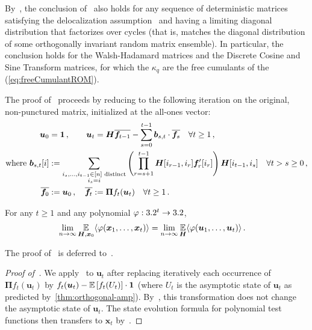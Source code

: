 \noindent By~, the conclusion of~ also holds for any sequence of deterministic matrices satisfying the delocalization assumption~ and having a limiting diagonal distribution that factorizes over cycles (that is, matches the diagonal distribution of some orthogonally invariant random matrix ensemble).
In particular, the conclusion holds for the Walsh-Hadamard matrices and the Discrete Cosine and Sine Transform matrices, for which the $\kappa_q$ are the free cumulants of the \rom  (\cref{eq:freeCumulantROM}).

The proof of~ proceeds by reducing to the following iteration on the original, non-punctured matrix, initialized at the all-ones vector:
\begin{alignat}{2}
    \bm u_0 &= \bm 1\,,\qquad
    \bm u_t
    = \bm H \overline{\bm f_{t-1}}
    - \sum_{s=0}^{t-1} \bm b_{s,t} \cdot \overline{\bm f_s} \quad \forall t\ge 1\,,\nonumber\\
    \text{where } {\bm b}_{s,t}[i]
    &:= \sum_{\substack{i_s,\ldots,i_{t-1}\in[n] \textnormal{ distinct}\\i_s=i}}
    \left(\prod_{r=s+1}^{t-1} \bm H[i_{r-1}, i_{r}] \bm f'_{r}[i_{r}] \right)
    {\bm H}[i_{t-1},i_s]\quad \forall t> s\ge 0\,,\label{eq:backtrackPunctured}\\
    \overline{\bm f_0} &:= \bm u_0\,,\quad \overline{\bm f_t} := \bm \Pi f_t(\bm u_t)\quad \forall t\ge 1\,.\nonumber
\end{alignat}

\begin{lemma}\label{lem:switchInit}
    For any $t\ge 1$ and any polynomial $\varphi:3.2^t \to 3.2$,
    \begin{align*}
        \lim_{n\to\infty} \operatorname*{\mathbb{E}}_{\bm H,\bm x_0} \langle \varphi(\bm x_1, \ldots, \bm x_t)\rangle &= \lim_{n\to\infty} \operatorname*{\mathbb{E}}_{\bm H} \langle \varphi(\bm u_1, \ldots, \bm u_t)\rangle\,.
    \end{align*}
\end{lemma}

\noindent The proof of~
is deferred to~.

\begin{proof}[Proof of~]
    We apply~ to $\bm u_t$ after replacing iteratively each occurrence of $\bm \Pi f_t(\bm u_t)$ by $f_t(\bm u_t) - \operatorname*{\mathbb{E}}\left[f_t(U_t)\right] \cdot \bm 1$ (where $U_t$ is the asymptotic state of $\bm u_t$ as predicted by~\cref{thm:orthogonal-amp}). By~, this transformation does not change the asymptotic state of $\bm u_t$.
    The state evolution formula for polynomial test functions then transfers to $\bm x_t$ by~.
\end{proof}

